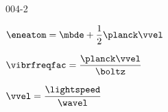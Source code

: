 \begin{mitframe}{004-2} %


    
\begin{listone}
        
    \item $\eneatom=\mbde+\dfrac{1}{2}\planck\vvel$
        
    \item $\vibrfreqfac=\dfrac{\planck\vvel}{\boltz}$
         
    \item $\vvel=\dfrac{\lightspeed}{\wavel}$   
    
\end{listone}			

\end{mitframe}